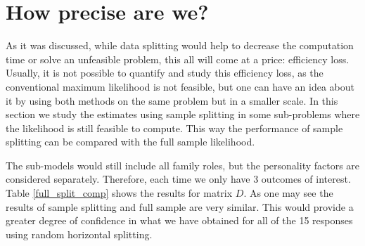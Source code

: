 \documentclass[11pt,a5paper,twoside]{book}
\begin{document}
\section{How precise are we?}
\label{how_good_sec}

As it was discussed, while data splitting would help to decrease the computation time or solve an unfeasible problem, this all will come at a price: efficiency loss. Usually, it is not possible to quantify and study this efficiency loss, as the conventional maximum likelihood is not feasible, but one can have an idea about it by using both methods on the same problem but in a smaller scale. In this section we study the estimates using sample splitting in some sub-problems where the likelihood is still feasible to compute. This way the performance of sample splitting can be compared with the full sample likelihood. 

The sub-models would still include all family roles, but the personality factors are considered separately. Therefore, each time we only have 3 outcomes of interest. Table \ref{full_split_comp} shows the results for matrix $D$. As one may see the results of sample splitting and full sample are very similar. This would provide a greater degree of confidence in what we have obtained for all of the 15 responses using random horizontal splitting.
\end{document}
